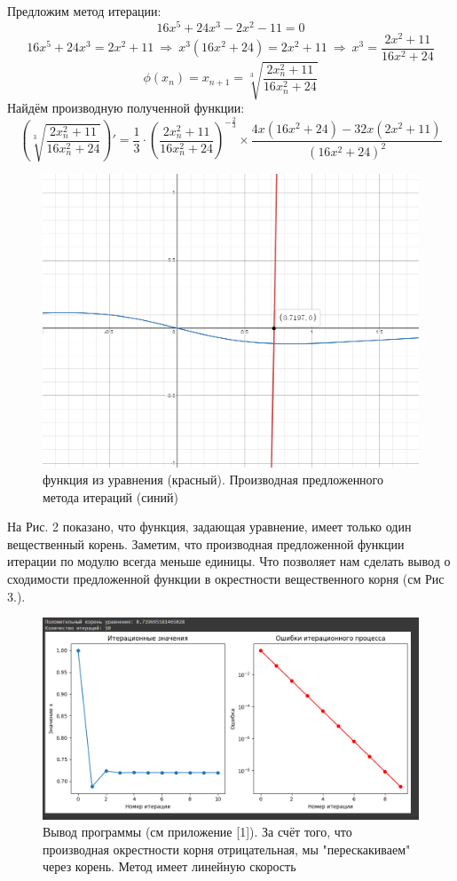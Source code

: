 \documentclass{article}
\begin{document}
	Предложим метод итерации:
	$$16x^5+24x^3-2x^2-11 = 0$$
	$$16x^5+24x^3=2x^2+11 \  \Rightarrow \ x^3 (16x^2+24) = 2x^2+11 \  \Rightarrow \ x^3 = \frac{2x^2+11}{16x^2+24}$$
	$$\phi(x_n) = x_{n+1} = \sqrt[3]{\frac{2x_n^2+11}{16x_n^2+24}}$$
	Найдём производную полученной функции:
	\[\left(\sqrt[3]{\frac{2x_n^2+11}{16x_n^2+24}}\right)' = \frac{1}{3}\cdot \left(\frac{2x_n^2+11}{16x_n^2+24}\right)^{-\frac{2}{3}}\times \frac{4x(16x^2+24) - 32x(2x^2+11)}{(16x^2+24)^2}\]
	\begin{figure}[h]
		\includegraphics[width=150mm,scale=0.6]{iterations1.png}
		\caption{функция из уравнения (красный). Производная предложенного метода итераций (синий)}
	\end{figure}
	\newline
	На Рис. 2 показано, что функция, задающая уравнение, имеет только один вещественный корень. Заметим, что производная предложенной функции итерации по модулю всегда меньше единицы. Что позволяет нам сделать вывод о сходимости предложенной функции в окрестности вещественного корня (см Рис 3.). 
	\begin{figure}[h]
		\includegraphics[width=160mm,scale=0.7]{iterations1_2.png}
		\caption{Вывод программы (см приложение [1]). За счёт того, что производная окрестности корня отрицательная, мы "перескакиваем" через корень. Метод имеет линейную скорость}
	\end{figure}
	\newpage
\end{document}
